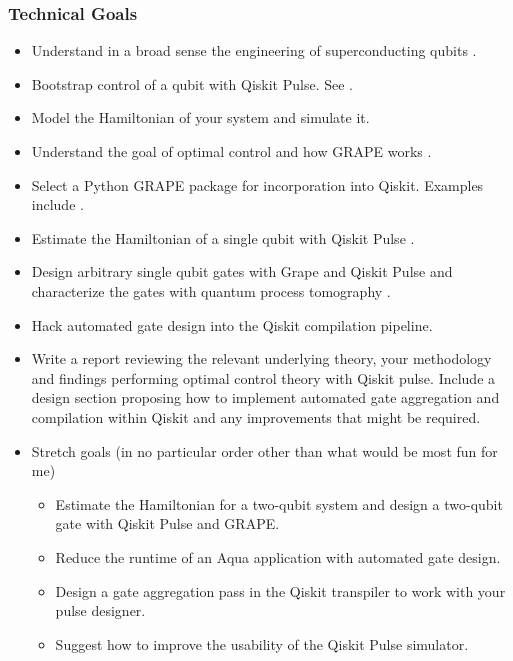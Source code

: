 \documentclass[11pt, letterpaper]{article}
\begin{document}
\subsubsection{Technical Goals}
\begin{itemize}
\item Understand in a broad sense the engineering of superconducting qubits \cite{blaisCavityQuantumElectrodynamics2004c, krantzQuantumEngineerGuide2019a}.
\item Bootstrap control of a qubit with Qiskit Pulse. See \cite{CalibratingQubitsQiskit}.
\item Model the Hamiltonian of your system and simulate it.
\item Understand the goal of optimal control and how GRAPE works \cite{khanejaOptimalControlCoupled2005c}.
\item Select a Python GRAPE package for incorporation into Qiskit. Examples include \cite{QuantumOptimalControl, SchusterLabQuantumoptimalcontrol2020, abdelhafezGradientbasedOptimalControl2019, QuantumUtilsMathematica}.
\item Estimate the Hamiltonian of a single qubit with Qiskit Pulse \cite{alexanderNotebooksDataQiskitPulse2020b, hincksHamiltonianLearningOnline2018, sheldonProcedureSystematicallyTuning2016b}.
\item Design arbitrary single qubit gates with Grape and Qiskit Pulse and characterize the gates with quantum process tomography \cite{alexanderNotebooksDataQiskitPulse2020b}.
\item Hack automated gate design into the Qiskit compilation pipeline.
\item Write a report reviewing the relevant underlying theory, your methodology and findings performing optimal control theory with Qiskit pulse.
Include a design section proposing how to implement automated gate aggregation \cite{shiOptimizedCompilationAggregated2019b} and compilation within Qiskit and any improvements that might be required.
\item Stretch goals (in no particular order other than what would be most fun for me)

\begin{itemize}
\item Estimate the Hamiltonian for a two-qubit system and design a two-qubit gate with Qiskit Pulse and GRAPE.
\item Reduce the runtime of an Aqua application with automated gate design.
\item Design a gate aggregation pass in the Qiskit transpiler to work with your pulse designer.
\item Suggest how to improve the usability of the Qiskit Pulse simulator.
\end{itemize}
\end{itemize}
\end{document}
